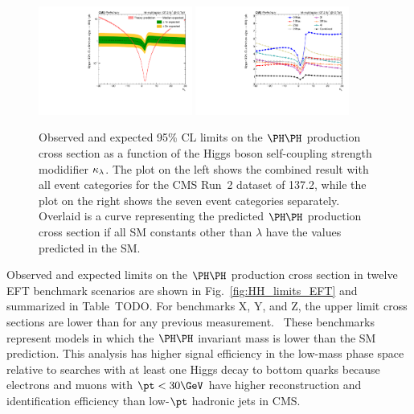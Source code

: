 \begin{figure}
  \centering
  \includegraphics[width=0.45\textwidth]{figures/klscan.pdf}
  \hspace{0.05\textwidth}
  \includegraphics[width=0.45\textwidth]{figures/klMultiscan.pdf}
  \caption{
    Observed and expected 95\% CL limits on the $\HH$ production cross section as
    a function of the Higgs boson self-coupling strength modidifier $\kappa_{\lambda}$.
    The plot on the left shows the combined result with all event categories for
    the CMS Run~2 dataset of 137.2\fbinv, while the plot on the right shows the
    seven event categories separately.  Overlaid is a curve representing the
    predicted $\HH$ production cross section if all SM constants other than
    $\lambda$ have the values predicted in the SM.
  }
  \label{fig:HH_limits_kLambda}
\end{figure}

Observed and expected limits on the $\HH$ production cross section in
twelve EFT benchmark scenarios are shown in Fig.~\ref{fig:HH_limits_EFT}
and summarized in Table~TODO.
For benchmarks X, Y, and Z, the upper limit cross sections are lower
than for any previous measurement.~\cite{Sirunyan:2745738}
These benchmarks represent models in which the $\HH$ invariant mass is
lower than the SM prediction.  This analysis has higher signal efficiency
in the low-mass phase space relative to searches with at least one Higgs decay
to bottom quarks because electrons and muons with $\pt < 30\GeV$ have higher
reconstruction and identification efficiency than low-$\pt$ hadronic jets in CMS.

